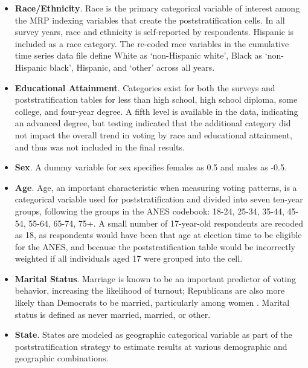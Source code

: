 \begin{itemize}

\item \textbf{Race/Ethnicity}. Race is the primary categorical variable of interest among the MRP indexing variables that create the poststratification cells. In all survey years, race and ethnicity is self-reported by respondents. Hispanic is included as a race category. The re-coded race variables in the cumulative time series data file define White as `non-Hispanic white', Black as `non-Hispanic black', Hispanic, and `other' across all years.  

\item \textbf{Educational Attainment}. Categories exist for both the surveys and poststratification tables for less than high school, high school diploma, some college, and four-year degree. A fifth level is available in the data, indicating an advanced degree, but testing indicated that the additional category did not impact the overall trend in voting by race and educational attainment, and thus was not included in the final results. 

\item \textbf{Sex}. A dummy variable for sex specifies females as 0.5 and males as -0.5. 

\item \textbf{Age}. Age, an important characteristic when measuring voting patterns, is a categorical variable used for poststratification and divided into seven ten-year groups, following the groups in the ANES codebook: 18-24, 25-34, 35-44, 45-54, 55-64, 65-74, 75+. A small number of 17-year-old respondents are recoded as 18, as respondents would have been that age at election time to be eligible for the ANES, and because the poststratification table would be incorrectly weighted if all individuals aged 17 were grouped into the cell. 

\item \textbf{Marital Status}. Marriage is known to be an important predictor of voting behavior, increasing the likelihood of turnout; Republicans are also more likely than Democrats to be married, particularly among women \citep{wolfinger_family_2008, gershkoff_marriage_2017}. Marital status is defined as never married, married, or other.

\item \textbf{State}. States are modeled as geographic categorical variable as part of the poststratification strategy to estimate results at various demographic and geographic combinations. 

\end{itemize}



